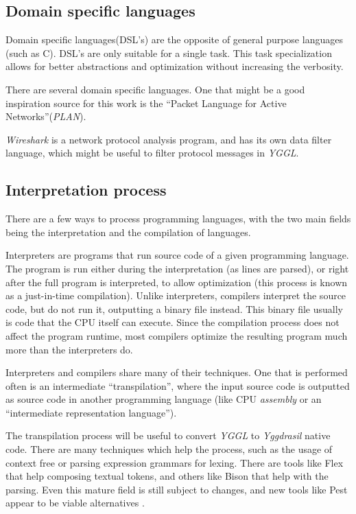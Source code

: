 \documentclass[runningheads]{llncs}
\begin{document}
\subsection*{Domain specific languages}
Domain specific languages(DSL's) are the opposite of general purpose languages (such as C). DSL's are only suitable for a single task. This task specialization allows for better abstractions and optimization without increasing the verbosity.
\par There are several domain specific languages. One that might be a good inspiration source for this work is the ``Packet Language for Active Networks''(\textit{PLAN}). \par \textit{Wireshark} is a network protocol analysis program, and has its own data filter language, which might be useful to filter protocol messages in \textit{YGGL}.
\subsection*{Interpretation process}
There are a few ways to process programming languages, with the two main fields being the interpretation and the compilation of languages.
\par Interpreters are programs that run source code of a given programming language. The program is run either during the interpretation (as lines are parsed), or right after the full program is interpreted, to allow optimization (this process is known as a just-in-time compilation). Unlike interpreters, compilers interpret the source code, but do not run it, outputting a binary file instead. This binary file usually is code that the CPU itself can execute. Since the compilation process does not affect the program runtime, most compilers optimize the resulting program much more than the interpreters do.
\par Interpreters and compilers share many of their techniques. One that is performed often is an intermediate ``transpilation'', where the input source code is outputted as source code in another programming language (like CPU \textit{assembly} or an ``intermediate representation language'').
\par The transpilation process will be useful to convert \textit{YGGL} to \textit{Yggdrasil} native code. There are many techniques which help the process, such as the usage of context free or parsing expression grammars for lexing. There are tools like Flex that help composing textual tokens, and others like Bison that help with the parsing. Even this mature field is still subject to changes, and new tools like Pest appear to be viable alternatives \cite{AppelModernCompiler:1997,FlexBisonLevine:2009,Pest:2019}.
\end{document}
